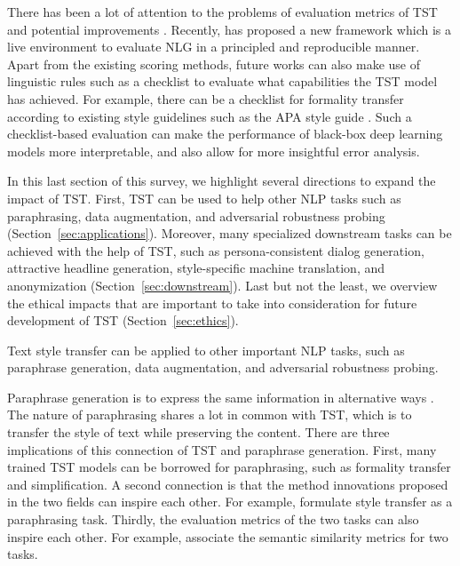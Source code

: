 \label{sec:improving_eval}
There has been a lot of attention to the problems of evaluation metrics of TST and potential improvements . 
Recently,  has proposed a new framework which is a live environment to evaluate NLG in a principled and reproducible manner.
Apart from the existing scoring methods, future works can also make use of linguistic rules such as a checklist to evaluate what capabilities the TST model has achieved. For example, there can be a checklist for formality transfer according to existing style guidelines such as the APA style guide . Such a checklist-based evaluation can make the performance of black-box deep learning models more interpretable, and also allow for more insightful error analysis.

\label{sec:impact}
In this last section of this survey, we highlight several directions to expand the impact of TST. First, TST can be used to help other NLP tasks such as paraphrasing, data augmentation, and adversarial robustness probing (Section~\ref{sec:applications}). Moreover, many specialized downstream tasks can be achieved with the help of TST, such as persona-consistent dialog generation, attractive headline generation, style-specific machine translation, and anonymization (Section~\ref{sec:downstream}). Last but not the least, we overview the ethical impacts that are important to take into consideration for future development of TST (Section~\ref{sec:ethics}).

\label{sec:applications}
Text style transfer can be applied to other important NLP tasks, such as paraphrase generation, data augmentation, and adversarial robustness probing.

Paraphrase generation is to express the same information in alternative ways . The nature of paraphrasing shares a lot in common with TST, which is to transfer the style of text while preserving the content. 
There are three implications of this connection of TST and paraphrase generation. First, many trained TST models can be borrowed for paraphrasing, such as formality transfer and simplification. A second connection is that the method innovations proposed in the two fields can inspire each other. For example,  formulate style transfer as a paraphrasing task. Thirdly, the evaluation metrics of the two tasks can also inspire each other. For example,  associate the semantic similarity metrics for two tasks.

